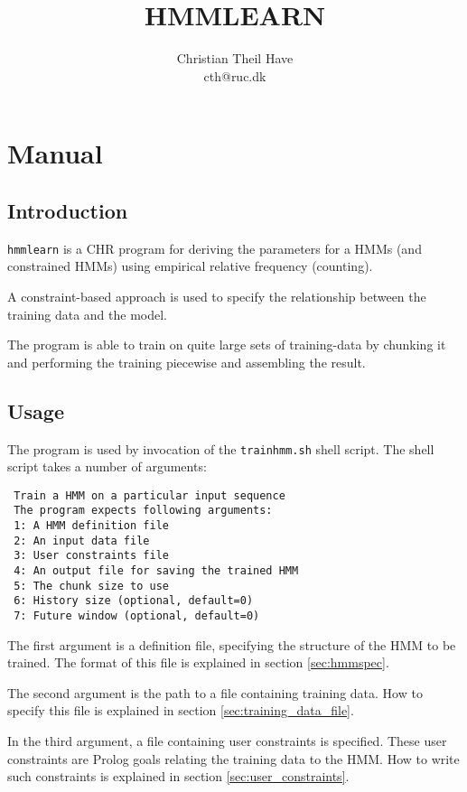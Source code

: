 \documentclass{article}
\title{HMMLEARN}
\author{Christian Theil Have\\ cth@ruc.dk}
\begin{document}
\maketitle


\section{Manual}

\subsection{Introduction}

\texttt{hmmlearn} is a CHR program for deriving the parameters for a HMMs (and constrained HMMs) using empirical relative frequency (counting). 

A constraint-based approach is used to specify the relationship between the training data and the model.

The program is able to train on quite large sets of training-data by chunking it and performing the training piecewise and assembling the result.

\subsection{Usage}

The program is used by invocation of the \texttt{trainhmm.sh} shell script. The shell script takes a number of arguments: 
\begin{verbatim}
 Train a HMM on a particular input sequence
 The program expects following arguments:
 1: A HMM definition file 
 2: An input data file
 3: User constraints file
 4: An output file for saving the trained HMM 
 5: The chunk size to use
 6: History size (optional, default=0)
 7: Future window (optional, default=0)
\end{verbatim}

The first argument is a definition file, specifying the structure of the HMM to be trained. The format of this file is explained in section \ref{sec:hmmspec}.

The second argument is the path to a file containing training data. How to specify this file is explained in section \ref{sec:training_data_file}. 

In the third argument, a file containing user constraints is specified. These user constraints are Prolog goals relating the training data to the HMM. How to write 
such constraints is explained in section \ref{sec:user_constraints}.
\end{document}
